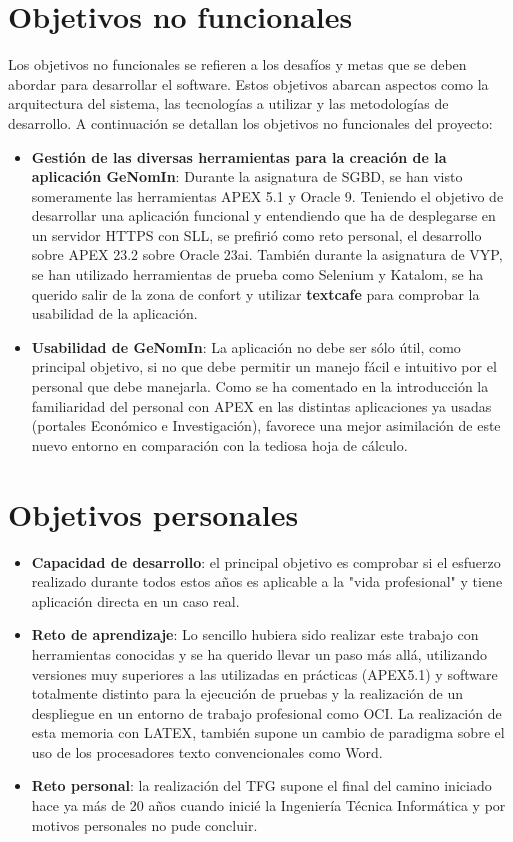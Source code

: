 \section{Objetivos no funcionales}

Los objetivos no funcionales se refieren a los desafíos y metas que se deben abordar para desarrollar el software. Estos objetivos abarcan aspectos como la arquitectura del sistema, las tecnologías a utilizar y las metodologías de desarrollo. A continuación se detallan los objetivos no funcionales del proyecto:

\begin{itemize}
	\item \textbf{Gestión de las diversas herramientas para la creación de la aplicación GeNomIn}: 
	Durante la asignatura de \acrfull{SGBD}, se han visto someramente las herramientas \acrshort{APEX} 5.1 y Oracle 9. Teniendo el objetivo de desarrollar una aplicación funcional y entendiendo que ha de desplegarse en un servidor \acrshort{HTTPS} con \gls{SLL}, se prefirió como reto personal, el desarrollo sobre \acrfull{APEX} 23.2 sobre Oracle 23ai. También durante la asignatura de \acrfull{VYP}, se han utilizado herramientas de prueba como Selenium y Katalom, se ha querido salir de la zona de confort y utilizar \textbf{textcafe} para comprobar la usabilidad de la aplicación.
	\item \textbf{Usabilidad de \textbf{GeNomIn}}: La aplicación no debe ser sólo útil, como principal objetivo, si no que debe permitir un manejo fácil e intuitivo por el personal que debe manejarla. Como se ha comentado en la introducción la familiaridad del personal con \acrfull{APEX} en las distintas aplicaciones ya usadas (portales Económico e Investigación), favorece una mejor asimilación de este nuevo entorno en comparación con la tediosa hoja de cálculo. 
\end{itemize}

\section{Objetivos personales}

\begin{itemize}
	\item \textbf{Capacidad de desarrollo}: el principal objetivo es comprobar si el esfuerzo realizado durante todos estos años es aplicable a la "vida profesional" y tiene aplicación directa en un caso real. 
	\item \textbf{Reto de aprendizaje}: Lo sencillo hubiera sido realizar este trabajo con herramientas conocidas y se ha querido llevar un paso más allá, utilizando versiones muy superiores a las utilizadas en prácticas (\acrshort{APEX}5.1) y software totalmente distinto para la ejecución de pruebas y la realización de un despliegue en un entorno de trabajo profesional como \acrshort{OCI}.
	La realización de esta memoria con \gls{LATEX}, también supone un cambio de paradigma sobre el uso de los procesadores texto convencionales como Word.
	\item \textbf{Reto personal}: la realización del \acrshort{TFG} supone el final del camino iniciado hace ya más de 20 años cuando inicié la Ingeniería Técnica Informática y por motivos personales no pude concluir.
\end{itemize}